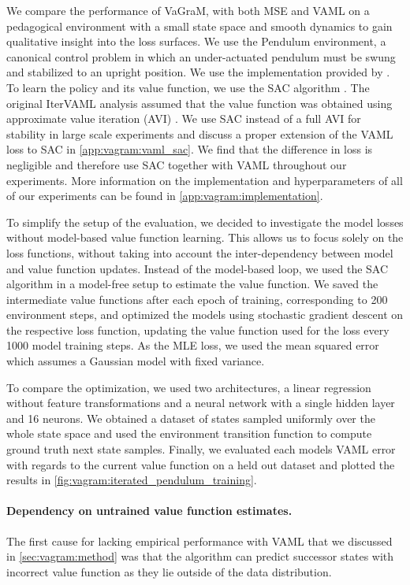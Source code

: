 We compare the performance of VaGraM, with both MSE and VAML on a pedagogical environment with a small state space and smooth dynamics to gain qualitative insight into the loss surfaces. 
We use the Pendulum environment, a canonical control problem in which an under-actuated pendulum must be swung and stabilized to an upright position.
We use the implementation provided by \textcite{brockman2016openai}.
To learn the policy and its value function, we use the SAC algorithm \parencite{sac}.
The original IterVAML analysis assumed that the value function was obtained using approximate value iteration (AVI) \parencite{gordon1995stable,ernst2005tree,farahmand2010error}. We use SAC instead of a full AVI for stability in large scale experiments and discuss a proper extension of the VAML loss to SAC in \autoref{app:vagram:vaml_sac}. We find that the difference in loss is negligible and therefore use SAC together with VAML throughout our experiments.
More information on the implementation and hyperparameters of all of our experiments can be found in \autoref{app:vagram:implementation}. 

To simplify the setup of the evaluation, we decided to investigate the model losses without model-based value function learning.
This allows us to focus solely on the loss functions, without taking into account the inter-dependency between model and value function updates.
Instead of the model-based loop, we used the SAC algorithm in a model-free setup to estimate the value function.
We saved the intermediate value functions after each epoch of training, corresponding to 200 environment steps, and optimized the models using stochastic gradient descent on the respective loss function, updating the value function used for the loss every 1000 model training steps.
As the MLE loss, we used the mean squared error which assumes a Gaussian model with fixed variance.

To compare the optimization, we used two architectures, a linear regression without feature transformations and a neural network with a single hidden layer and 16 neurons.
We obtained a dataset of states sampled uniformly over the whole state space and used the environment transition function to compute ground truth next state samples.
Finally, we evaluated each models VAML error with regards to the current value function on a held out dataset and plotted the results in \autoref{fig:vagram:iterated_pendulum_training}.

\paragraph{Dependency on untrained value function estimates.}
The first cause for lacking empirical performance with VAML that we discussed in \autoref{sec:vagram:method} was that the algorithm can predict successor states with incorrect value function as they lie outside of the data distribution.

